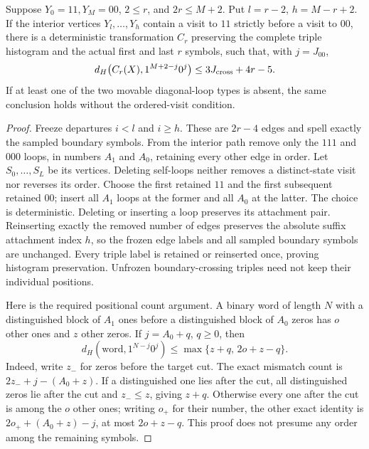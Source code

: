 \begin{lemma}
\label{lem:relocation}
Suppose $Y_0=11,Y_M=00$, $2\le r$, and $2r\le M+2$.
Put $l=r-2$, $h=M-r+2$. If the interior vertices
$Y_l,\ldots,Y_h$ contain a visit to $11$ strictly before a visit to $00$,
there is a deterministic transformation $C_r$ preserving the complete
triple histogram and the actual first and last $r$ symbols, such that,
with $j=J_{00}$,
\begin{equation}
 d_H\bigl(C_r(X),1^{M+2-j}0^j\bigr)
 \le3J_{\rm cross}+4r-5.
 \label{eq:relocation-distance}
\end{equation}
If at least one of the two movable diagonal-loop types is absent, the
same conclusion holds without the ordered-visit condition.
\end{lemma}
\begin{proof}
Freeze departures $i<l$ and $i\ge h$. These are $2r-4$ edges and
spell exactly the sampled boundary symbols. From the interior path
remove only the $111$ and $000$ loops, in numbers $A_1$ and $A_0$,
retaining every other edge in order. Let $S_0,\ldots,S_L$ be its vertices.
Deleting self-loops neither removes a distinct-state visit nor reverses
its order. Choose the first retained $11$ and the first subsequent
retained $00$; insert all $A_1$ loops at the former and all $A_0$ at
the latter. The choice is deterministic. Deleting or inserting a loop
preserves its attachment pair. Reinserting exactly the removed number
of edges preserves the absolute suffix attachment index $h$, so the
frozen edge labels and all sampled boundary symbols are unchanged.
Every triple label is retained or reinserted once, proving histogram
preservation. Unfrozen boundary-crossing triples need not keep their
individual positions.

Here is the required positional count argument. A binary word of length
$N$ with a distinguished block of $A_1$ ones before a distinguished
block of $A_0$ zeros has $o$ other ones and $z$ other zeros. If
$j=A_0+q$, $q\ge0$, then
\begin{equation}
 d_H(\text{word},1^{N-j}0^j)
 \le\max\{z+q,\,2o+z-q\}. \label{eq:two-block-distance}
\end{equation}
Indeed, write $z_-$ for zeros before the target cut. The exact mismatch
count is $2z_-+j-(A_0+z)$. If a distinguished one lies after the cut,
all distinguished zeros lie after the cut and $z_-\le z$, giving
$z+q$. Otherwise every one after the cut is among the $o$ other ones;
writing $o_+$ for their number, the other exact identity is
$2o_++(A_0+z)-j$, at most $2o+z-q$. This proof does not presume any
order among the remaining symbols.


\end{proof}

